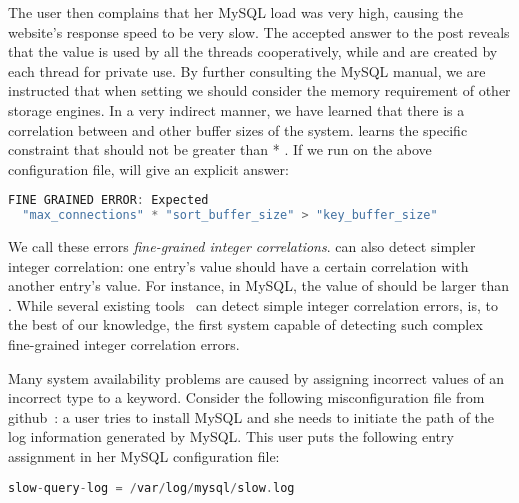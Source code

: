 The user then complains that her MySQL load was very high, 
causing the website's response speed to be very slow.
The accepted answer to the post reveals that the value  
is used by all the threads cooperatively, 
while  and  are created 
by each thread for private use.
By further consulting the MySQL manual, 
we are instructed that when setting  we should consider the memory requirement of other storage engines.
In a very indirect manner, we have learned that there is a correlation
between  and other buffer sizes of the system.
\app learns the specific constraint that
 should not be greater than
 * .
If we run \app on the above configuration file, \app will give an explicit answer:

\begin{lstlisting}[language=C, xleftmargin=.01\textwidth]
FINE GRAINED ERROR: Expected 
  "max_connections" * "sort_buffer_size" > "key_buffer_size"
\end{lstlisting} 

We call these errors {\em fine-grained integer correlations}. 
\app can also detect simpler integer correlation: one entry's
value should have a certain correlation with another entry's 
value.
For instance, in MySQL, the value of  
should be larger than .
While several existing tools~\cite{santolucitoCAV, zhang14encore}
can detect simple integer correlation errors,
\app is, to the best of our knowledge, the first system capable of
detecting such complex fine-grained integer correlation errors.

Many system availability problems are caused by 
assigning incorrect values of an incorrect type to a keyword. Consider the following  misconfiguration
file from github~\cite{typeerror}:
a user tries to install MySQL and she needs to initiate the path
of the log information generated by MySQL.
This user puts the following entry assignment in her MySQL
configuration file: 

\begin{lstlisting}[language=C, xleftmargin=.01\textwidth]
    slow-query-log = /var/log/mysql/slow.log
\end{lstlisting} 

